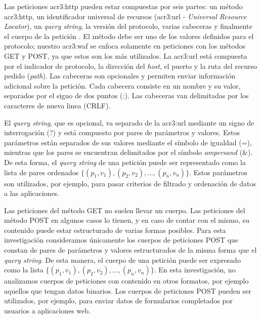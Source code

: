 Las peticiones \gls{acr3:http} pueden estar compuestas por seis partes:
un método \gls{acr3:http}, un identificador universal de recursos
(\gls{acr3:url} - \textit{Universal Resource Locator}), un \textit{query string},
la versión del protocolo, varias cabeceras y finalmente el cuerpo de la
petición \citep{fielding1999http}. %
El método debe ser uno de los valores definidos para el protocolo; nuestro
\gls{acr3:waf} se enfoca solamente en peticiones con los métodos GET y POST,
ya que estos son los más utilizados.
La \gls{acr3:url} está compuesta por el indicador de protocolo, la dirección
del \textit{host}, el puerto y la ruta del recurso pedido (\textit{path}).
Las cabeceras son opcionales y permiten enviar información adicional sobre
la petición. Cada cabecera consiste en un nombre y su valor, separados por
el signo de dos puntos (:). Las cabeceras van delimitadas por los caracteres
de nueva linea (CRLF).

El \textit{query string}, que es opcional, va separado de la \gls{acr3:url}
mediante un signo de interrogación (?) y está compuesto por pares de
parámetros y valores. Estos parámetros están separados de sus valores
mediante el símbolo de igualdad (=), mientras que los pares se encuentran
delimitados por el símbolo \textit{ampersand} (\&). De esta forma, el
\textit{query string} de una petición puede ser representado como la lista
de pares ordenados
$\{ (p_{1}, v_{1}), (p_{2}, v_{2}), \dots , (p_{n}, v_{n}) \}$.
Estos parámetros son utilizados, por ejemplo, para pasar criterios de
filtrado y ordenación de datos a las aplicaciones.

Las peticiones del método GET no suelen llevar un cuerpo. Las peticiones
del método POST en algunos casos lo tienen, y en caso de contar con el
mismo, su contenido puede estar estructurado de varias formas posibles.
Para esta investigación consideramos únicamente los cuerpos de peticiones
POST que constan de pares de parámetros y valores estructurados de la
misma forma que el \textit{query string}. De esta manera, el cuerpo de
una petición puede ser expresado como la lista
$\{ (p_{1}, v_{1}), (p_{2}, v_{2}), \dots , (p_{n}, v_{n}) \}$.
En esta investigación, no analizamos cuerpos de peticiones con contenido
en otros formatos, por ejemplo aquellos que tengan datos binarios.
Los cuerpos de peticiones POST pueden ser utilizados, por ejemplo, para
enviar datos de formularios completados por usuarios a aplicaciones web.

